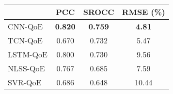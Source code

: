 

  \begin{tabular}{|l|c|c|c|}
    \hline
    & PCC & SROCC & RMSE (\%)\\ \hline
    CNN-QoE & \textbf{0.820} & \textbf{0.759} & \textbf{4.81} \\ \hline
    TCN-QoE       & 0.670 & 0.732 & 5.47 \\ \hline
    LSTM-QoE \cite{QoEModel_LSTM}        & 0.800 & 0.730 & 9.56 \\ \hline
    NLSS-QoE \cite{QoEModel_NLSS}        & 0.767 & 0.685 & 7.59 \\ \hline
    SVR-QoE \cite{LFOVIA}         & 0.686 & 0.648 & 10.44 \\ \hline
  \end{tabular}
